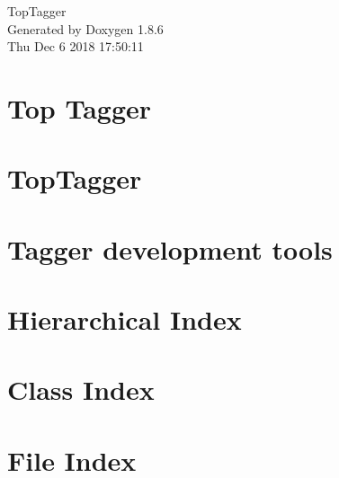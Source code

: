 \documentclass[twoside]{book}
\newcommand{\clearemptydoublepage}{%
  \newpage{\pagestyle{empty}\cleardoublepage}%
}
\begin{document}
\hypersetup{pageanchor=false}
\begin{titlepage}
\vspace*{7cm}
\begin{center}%
{\Large Top\-Tagger }\\
\vspace*{1cm}
{\large Generated by Doxygen 1.8.6}\\
\vspace*{0.5cm}
{\small Thu Dec 6 2018 17:50:11}\\
\end{center}
\end{titlepage}
\clearemptydoublepage
\tableofcontents
\clearemptydoublepage
{}
\hypersetup{pageanchor=true}

\chapter{Top Tagger}
\label{index}\hypertarget{index}{}
\chapter{Top\-Tagger}
\label{md__home_travis_build_susy2015_TopTagger_README}
\hypertarget{md__home_travis_build_susy2015_TopTagger_README}{}

\chapter{Tagger development tools}
\label{md__home_travis_build_susy2015_TopTagger_Tools_README}
\hypertarget{md__home_travis_build_susy2015_TopTagger_Tools_README}{}

\chapter{Hierarchical Index}

\chapter{Class Index}

\chapter{File Index}

\end{document}
